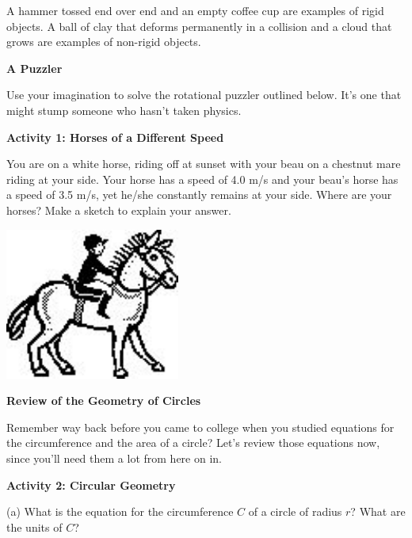 A hammer tossed end over end and an empty coffee cup are examples of rigid objects.
A ball of clay that deforms permanently in a collision and a cloud that grows
are examples of non-rigid objects. 
\vspace{0.3cm}

\textbf{A Puzzler} 

Use your imagination to solve the rotational puzzler outlined below. It's one
that might stump someone who hasn't taken physics.

\textbf{Activity 1: Horses of a Different Speed }

You are on a white horse, riding off at sunset with your beau on a chestnut
mare riding at your side. Your horse has a speed of 4.0 m/s and your beau's
horse has a speed of 3.5 m/s, yet he/she constantly remains at your side. Where
are your horses? Make a sketch to explain your answer.

\vspace{0.3cm}
{\par\raggedright \includegraphics{rotation/rotation_fig3.pdf} \par}
\vspace{0.3cm}

\textbf{Review of the Geometry of Circles }

Remember way back before you came to college when you studied equations for
the circumference and the area of a circle? Let's review those equations now,
since you'll need them a lot from here on in.

\textbf{Activity 2: Circular Geometry} 

(a) What is the equation for the circumference $C$ of a circle of radius $r$?
What are the units of $C$?

